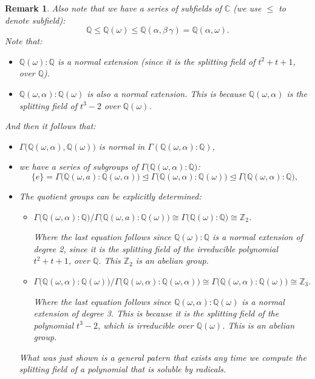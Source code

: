 \documentclass[a4paper,12pt]{article}
\newtheorem{Remark}[Theorem]{Remark}
\newtheorem{Fundamental Theorem}{Fundamental Theorem}
\newcommand{\C}{ \mathbb{C} }
\newcommand{\Z}{ \mathbb{Z} }
\newcommand{\Q}{\mathbb{Q}}
\renewcommand{\a}{{\alpha}}
\renewcommand{\b}{{\beta}}
\def \g {\gamma}
\def \w {\omega}
\begin{document}
\medskip

\begin{Remark}
Also note that we have  a series of subfields of $\C$ (we use $\leq$ to denote subfield):
 $$\Q \leq \Q(\w) \leq  \Q(\a,\b\,\g)=\Q(\a,\w).$$
 Note that:
 \begin{itemize}
  \item $\Q(\w): \Q$ is a normal extension (since it is the splitting field of $t^2+t+1$, over $\Q$).
  \item $\Q(\w,\a):\Q(\w)$ is also a normal extension. This is because $\Q(\w,\a)$ is the splitting field of $t^3-2$ over $\Q(\w)$.
 \end{itemize}
And then it follows that:
\begin{itemize}
 \item $\Gamma\big (\Q(\w,\a),\Q(\w)\big)$ is normal in $\Gamma(\Q(\w,\a): \Q)$,

 \item we have a series of subgroups of $\Gamma\big ( \Q(\w,\a): \Q \big)$:
 $$\{e\}=\Gamma\big ( \Q(\w,a): \Q(\w,\a) \big)\trianglelefteq \Gamma\big ( \Q(\w,\a): \Q(\w) \big) \trianglelefteq \Gamma\big ( \Q(\w,\a): \Q \big),$$
 \item The quotient groups can be explicitly determined:
   \smallskip

 \begin{itemize}
  \item
  $\Gamma\big ( \Q(\w,\a): \Q  \big) / \Gamma\big ( \Q(\w,a): \Q(\w) \big) \cong \Gamma\big(\Q(\w): \Q)\cong \Z_2$.

  \smallskip
  Where the last equation follows since $\Q(\w): \Q$ is a normal extension of degree 2, since it is the splitting field of the irreducible polynomial $t^2+t+1$, over $\Q$.
  This $\Z_2$ is an abelian group.

  \smallskip

  \item $\Gamma\big ( \Q(\w,\a): \Q(\w)  \big) / \Gamma\big ( \Q(\w,\a): \Q(\w,\a) \big) \cong \Gamma\big(\Q(\w,\a): \Q(\w))\cong \Z_3. $
  \smallskip

  Where the last equation follows since $\Q(\w,\a): \Q(\w)$ is a normal extension of degree 3. This is because it is the splitting field of the polynomial $t^3-2$, which is irreducible over $\Q(\w)$.
  This is an abelian group.
  \end{itemize}

\bigskip
 What was just shown is a general patern that exists any time we compute the splitting field of a polynomial that is soluble by radicals.

\end{itemize}
\end{Remark}
\end{document}
